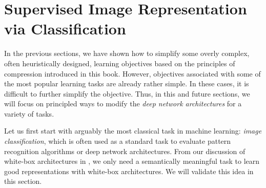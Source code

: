 \documentclass[../../book-main.tex]{subfiles}
\begin{document}
\begin{table}[t]
\centering
{}
\caption{The performance of LIFT and CLIP on seven SugarCrepe tasks.
    We use an open-source CLIP implementation,
    OpenCLIP~\citep{ilharco_gabriel_2021_5143773}, and train both
    OpenCLIP and LIFT on the open-source text--image pair dataset
    DataComp~\citep{gadre2023datacompsearchgenerationmultimodal}. We
report accuracy for each task, with the best results bolded.}
\label{tab:Compositionality}
\end{table}

\section{Supervised Image Representation via
Classification}\label{sec:image_classification}

In the previous sections, we have shown how to simplify some overly
complex, often heuristically designed, learning objectives based on
the principles of compression introduced in this book. However,
objectives associated with some of the most popular learning tasks
are already rather simple. In these cases, it is difficult to further
simplify the objective. Thus, in this and future sections, we will
focus on principled ways to modify the \textit{deep network
architectures} for a variety of tasks.

Let us first start with arguably the most classical task in machine
learning: \textit{image classification}, which is often used as a
standard task to evaluate pattern recognition algorithms or deep
network architectures. From our discussion of white-box architectures
in , we only need a semantically meaningful
task to learn good representations with white-box architectures. We
will validate this idea in this section.
\end{document}
